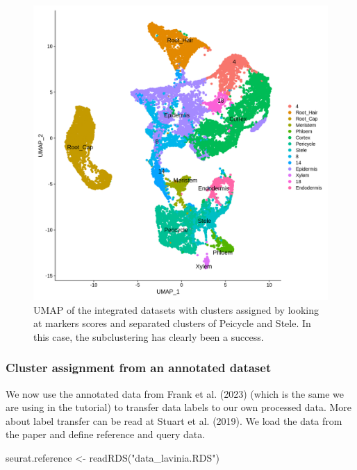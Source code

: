 \documentclass[
  letterpaper,
  DIV=11,
  numbers=noendperiod]{scrartcl}
\newenvironment{Shaded}{\begin{snugshade}}{\end{snugshade}}
\newcommand{\FunctionTok}[1]{\textcolor[rgb]{0.02,0.16,0.49}{#1}}
\newcommand{\NormalTok}[1]{\textcolor[rgb]{0.00,0.44,0.13}{#1}}
\newcommand{\OtherTok}[1]{\textcolor[rgb]{0.00,0.44,0.13}{#1}}
\newcommand{\StringTok}[1]{\textcolor[rgb]{0.25,0.44,0.63}{#1}}
\begin{document}
\begin{figure}[H]

{\centering \includegraphics{notebook_files/figure-pdf/fig-umapsubcluster-output-1.png}

}

\caption{\label{fig-umapsubcluster}UMAP of the integrated datasets with
clusters assigned by looking at markers scores and separated clusters of
Peicycle and Stele. In this case, the subclustering has clearly been a
success.}

\end{figure}

\hypertarget{cluster-assignment-from-an-annotated-dataset}{%
\subsubsection{Cluster assignment from an annotated
dataset}\label{cluster-assignment-from-an-annotated-dataset}}

We now use the annotated data from Frank et al. (2023) (which is the
same we are using in the tutorial) to transfer data labels to our own
processed data. More about label transfer can be read at Stuart et al.
(2019). We load the data from the paper and define reference and query
data.

\begin{Shaded}
\begin{Highlighting}[]
\NormalTok{seurat.reference }\OtherTok{\textless{}{-}} \FunctionTok{readRDS}\NormalTok{(}\StringTok{"data\_lavinia.RDS"}\NormalTok{)}
\end{Highlighting}
\end{Shaded}
\end{document}
